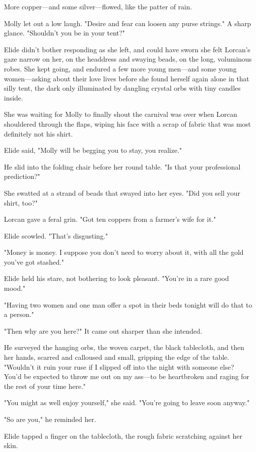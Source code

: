 More copper---and some silver---flowed, like the patter of rain.

Molly let out a low laugh.
"Desire and fear can loosen any purse strings."
A sharp glance.
"Shouldn't you be in your tent?"

Elide didn't bother responding as she left, and could have sworn she felt Lorcan's gaze narrow on her, on the headdress and swaying beads, on the long, voluminous robes.
She kept going, and endured a few more young men---and some young women---asking about their love lives before she found herself again alone in that silly tent, the dark only illuminated by dangling crystal orbs with tiny candles inside.

She was waiting for Molly to finally shout the carnival was over when Lorcan shouldered through the flaps, wiping his face with a scrap of fabric that was most definitely not his shirt.

Elide said, "Molly will be begging you to stay, you realize."

He slid into the folding chair before her round table.
"Is that your professional prediction?"

She swatted at a strand of beads that swayed into her eyes.
"Did you sell your shirt, too?"

Lorcan gave a feral grin.
"Got ten coppers from a farmer's wife for it."

Elide scowled.
"That's disgusting."

"Money is money.
I suppose you don't need to worry about it, with all the gold you've got stashed."

Elide held his stare, not bothering to look pleasant.
"You're in a rare good mood."

"Having two women and one man offer a spot in their beds tonight will do that to a person."

"Then why are you here?"
It came out sharper than she intended.

He surveyed the hanging orbs, the woven carpet, the black tablecloth, and then her hands, scarred and calloused and small, gripping the edge of the table.
"Wouldn't it ruin your ruse if I slipped off into the night with someone else?
You'd be expected to throw me out on my ass---to be heartbroken and raging for the rest of your time here."

"You might as well enjoy yourself," she said.
"You're going to leave soon anyway."

"So are you," he reminded her.

Elide tapped a finger on the tablecloth, the rough fabric scratching against her skin.

